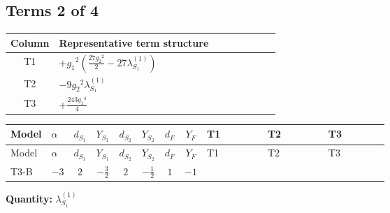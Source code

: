 \documentclass[8pt]{article}
\begin{document}
\begin{landscape}
\subsection*{Terms 2 of 4}
\begin{center}
\begin{tabular}{@{}c >{\raggedright\arraybackslash}p{0.82\linewidth}@{}}
\toprule
Column & Representative term structure \\
\midrule
T1 & \(\displaystyle +{g_1}^2 \left(\frac{27 {g_2}^2}{2}-27 {\lambda_{S_1}^{(1)}}\right)\) \\
\midrule
T2 & \(\displaystyle -9 {g_2}^2 {\lambda_{S_1}^{(1)}}\) \\
\midrule
T3 & \(\displaystyle +\frac{243 {g_1}^4}{4}\) \\
\midrule
\bottomrule
\end{tabular}
\end{center}
\smallskip
\tiny
\begin{longtable}{@{}llcccccc >{\raggedright\arraybackslash}p{0.21\linewidth} >{\raggedright\arraybackslash}p{0.21\linewidth} >{\raggedright\arraybackslash}p{0.21\linewidth}@{}}
\toprule
Model & $\alpha$ & $d_{S_1}$ & $Y_{S_1}$ & $d_{S_2}$ & $Y_{S_2}$ & $d_F$ & $Y_F$ & T1 & T2 & T3 \\
\midrule
\endfirsthead
\toprule
Model & $\alpha$ & $d_{S_1}$ & $Y_{S_1}$ & $d_{S_2}$ & $Y_{S_2}$ & $d_F$ & $Y_F$ & T1 & T2 & T3 \\
\midrule
\endhead
T3-B & $-3$ & $2$ & $-\frac{3}{2}$ & $2$ & $-\frac{1}{2}$ & $1$ & $-1$ & \scriptsize\adjustbox{max width=\linewidth}{$\begin{gathered} +{g_1}^2 \left(\frac{27 {g_2}^2}{2}-27 {\lambda_{S_1}^{(1)}}\right)\end{gathered}$} & \scriptsize\adjustbox{max width=\linewidth}{$\begin{gathered} -9 {g_2}^2 {\lambda_{S_1}^{(1)}}\end{gathered}$} & \scriptsize\adjustbox{max width=\linewidth}{$\begin{gathered} +\frac{243 {g_1}^4}{4}\end{gathered}$} \\
\midrule
\bottomrule
\end{longtable}
\clearpage
\noindent\textbf{Quantity: }$\lambda_{S_1}^{(1)}$\par\smallskip

\end{landscape}
\end{document}
